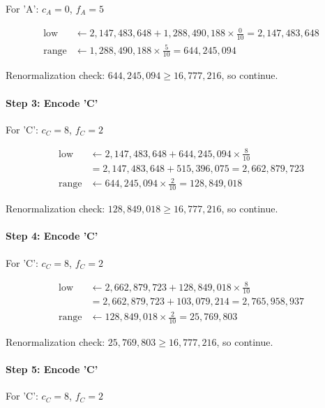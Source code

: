 For 'A': $c_A = 0$, $f_A = 5$

\[
\begin{aligned}
\text{low} &\gets 2{,}147{,}483{,}648 + 1{,}288{,}490{,}188 \times \frac{0}{10} = 2{,}147{,}483{,}648 \\
\text{range} &\gets 1{,}288{,}490{,}188 \times \frac{5}{10} = 644{,}245{,}094
\end{aligned}
\]

Renormalization check: $644{,}245{,}094 \ge 16{,}777{,}216$, so continue.

\paragraph{Step 3: Encode 'C'}

For 'C': $c_C = 8$, $f_C = 2$

\[
\begin{aligned}
\text{low} &\gets 2{,}147{,}483{,}648 + 644{,}245{,}094 \times \frac{8}{10} \\
&= 2{,}147{,}483{,}648 + 515{,}396{,}075 = 2{,}662{,}879{,}723 \\
\text{range} &\gets 644{,}245{,}094 \times \frac{2}{10} = 128{,}849{,}018
\end{aligned}
\]

Renormalization check: $128{,}849{,}018 \ge 16{,}777{,}216$, so continue.

\paragraph{Step 4: Encode 'C'}

For 'C': $c_C = 8$, $f_C = 2$

\[
\begin{aligned}
\text{low} &\gets 2{,}662{,}879{,}723 + 128{,}849{,}018 \times \frac{8}{10} \\
&= 2{,}662{,}879{,}723 + 103{,}079{,}214 = 2{,}765{,}958{,}937 \\
\text{range} &\gets 128{,}849{,}018 \times \frac{2}{10} = 25{,}769{,}803
\end{aligned}
\]

Renormalization check: $25{,}769{,}803 \ge 16{,}777{,}216$, so continue.

\paragraph{Step 5: Encode 'C'}

For 'C': $c_C = 8$, $f_C = 2$

